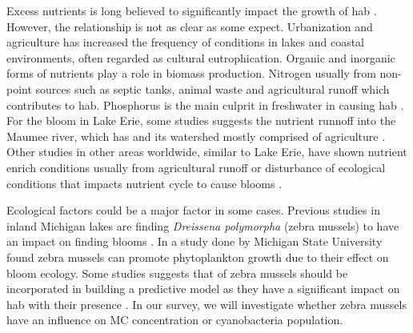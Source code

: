 Excess nutrients is long believed to significantly impact the growth of \gls{hab} \cite{anderson_harmful_2002,anderson_harmful_2002}. However, the relationship is not as clear as some expect. Urbanization and agriculture has increased the frequency of  conditions in lakes and coastal environments, often regarded as cultural eutrophication\cite{smith_eutrophication_2009}.  Organic and inorganic forms of nutrients  play a role in biomass production. Nitrogen usually from non-point sources such as septic tanks, animal waste and agricultural runoff which contributes to \gls{hab}. Phosphorus is the main culprit in freshwater in causing \gls{hab} \cite{anderson_harmful_2002}. For the bloom in Lake Erie, some studies suggests the nutrient runnoff into the  Maumee river, which has and its watershed mostly comprised of agriculture \cite{michalak_record-setting_2013, chaffin_accuracy_2018}. Other studies in other areas worldwide, similar to Lake Erie, have shown nutrient enrich conditions usually from agricultural runoff or disturbance of ecological conditions that impacts nutrient cycle to cause blooms \cite{ahn_evaluation_2011, ahn_rainfall_2002, anderson_harmful_2002, jiang_statistical_2008}.

Ecological factors could be a major factor in some cases. Previous studies in inland Michigan lakes are finding \emph{Dreissena polymorpha} (zebra mussels) to have an impact on finding blooms \cite{vanderploeg_zebra_2001}. In a study done by Michigan State University \cite{raikow_dominance_2004} found zebra mussels can promote phytoplankton growth due to their effect on bloom ecology. Some studies suggests that of zebra mussels should be incorporated in building a predictive model as they have a significant impact on \gls{hab} with their presence \cite{lavrentyev_effects_1995, knoll_invasive_2008, raikow_dominance_2004}. In our survey, we will investigate whether zebra mussels have an influence on MC concentration or cyanobacteria population.


